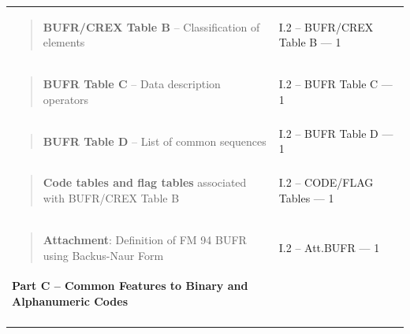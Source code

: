 \begin{longtable}[]{@{}ll@{}}
\begin{minipage}[t]{0.47\columnwidth}
\begin{quote}
\textbf{BUFR/CREX Table B} -- Classification of elements
\end{quote}\strut
\end{minipage} & \begin{minipage}[t]{0.47\columnwidth}\raggedright
I.2 -- BUFR/CREX Table B --- 1\strut
\end{minipage}\tabularnewline
\begin{minipage}[t]{0.47\columnwidth}\raggedright
\begin{quote}
\textbf{BUFR Table C} -- Data description operators
\end{quote}\strut
\end{minipage} & \begin{minipage}[t]{0.47\columnwidth}\raggedright
I.2 -- BUFR Table C --- 1\strut
\end{minipage}\tabularnewline
\begin{minipage}[t]{0.47\columnwidth}\raggedright
\begin{quote}
\textbf{BUFR Table D} -- List of common sequences
\end{quote}\strut
\end{minipage} & \begin{minipage}[t]{0.47\columnwidth}\raggedright
I.2 -- BUFR Table D --- 1\strut
\end{minipage}\tabularnewline
\begin{minipage}[t]{0.47\columnwidth}\raggedright
\begin{quote}
\textbf{Code tables and flag tables} associated with BUFR/CREX Table B
\end{quote}\strut
\end{minipage} & \begin{minipage}[t]{0.47\columnwidth}\raggedright
I.2 -- CODE/FLAG Tables --- 1\strut
\end{minipage}\tabularnewline
\begin{minipage}[t]{0.47\columnwidth}\raggedright
\begin{quote}
\textbf{Attachment}: Definition of FM 94 BUFR using Backus-Naur Form
\end{quote}\strut
\end{minipage} & \begin{minipage}[t]{0.47\columnwidth}\raggedright
I.2 -- Att.BUFR --- 1\strut
\end{minipage}\tabularnewline
\textbf{Part C -- Common Features to Binary and Alphanumeric Codes} &\tabularnewline
\begin{minipage}[t]{0.47\columnwidth}\raggedright
\begin{quote}

\end{quote}
\end{minipage}
\end{longtable}
